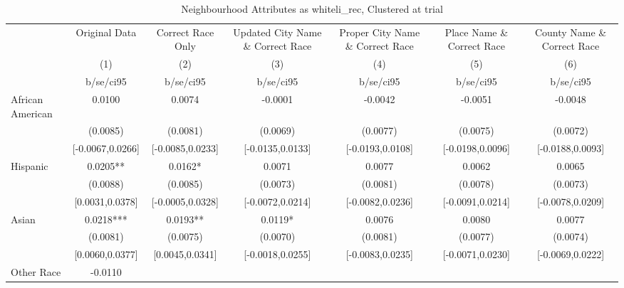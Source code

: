 \documentclass{article}
\begin{document}
\begin{table}[htbp]\centering
\def\sym#1{\ifmmode^{#1}\else\(^{#1}\)\fi}
\caption{Neighbourhood Attributes as whiteli\_rec, Clustered at trial}
\begin{tabular}{l*{6}{c}}
\toprule
                    &\multicolumn{1}{c}{Original Data}&\multicolumn{1}{c}{Correct Race Only}&\multicolumn{1}{c}{Updated City Name \& Correct Race}&\multicolumn{1}{c}{Proper City Name \& Correct Race}&\multicolumn{1}{c}{Place Name \& Correct Race}&\multicolumn{1}{c}{County Name \& Correct Race}\\\cmidrule(lr){2-2}\cmidrule(lr){3-3}\cmidrule(lr){4-4}\cmidrule(lr){5-5}\cmidrule(lr){6-6}\cmidrule(lr){7-7}
                    &\multicolumn{1}{c}{(1)}   &\multicolumn{1}{c}{(2)}   &\multicolumn{1}{c}{(3)}   &\multicolumn{1}{c}{(4)}   &\multicolumn{1}{c}{(5)}   &\multicolumn{1}{c}{(6)}   \\
                    &   b/se/ci95   &   b/se/ci95   &   b/se/ci95   &   b/se/ci95   &   b/se/ci95   &   b/se/ci95   \\
\midrule
African American    &      0.0100   &      0.0074   &     -0.0001   &     -0.0042   &     -0.0051   &     -0.0048   \\
                    &    (0.0085)   &    (0.0081)   &    (0.0069)   &    (0.0077)   &    (0.0075)   &    (0.0072)   \\
                    &[-0.0067,0.0266]   &[-0.0085,0.0233]   &[-0.0135,0.0133]   &[-0.0193,0.0108]   &[-0.0198,0.0096]   &[-0.0188,0.0093]   \\
Hispanic            &      0.0205** &      0.0162*  &      0.0071   &      0.0077   &      0.0062   &      0.0065   \\
                    &    (0.0088)   &    (0.0085)   &    (0.0073)   &    (0.0081)   &    (0.0078)   &    (0.0073)   \\
                    &[0.0031,0.0378]   &[-0.0005,0.0328]   &[-0.0072,0.0214]   &[-0.0082,0.0236]   &[-0.0091,0.0214]   &[-0.0078,0.0209]   \\
Asian               &      0.0218***&      0.0193** &      0.0119*  &      0.0076   &      0.0080   &      0.0077   \\
                    &    (0.0081)   &    (0.0075)   &    (0.0070)   &    (0.0081)   &    (0.0077)   &    (0.0074)   \\
                    &[0.0060,0.0377]   &[0.0045,0.0341]   &[-0.0018,0.0255]   &[-0.0083,0.0235]   &[-0.0071,0.0230]   &[-0.0069,0.0222]   \\
Other Race          &     -0.0110   &               &               &               &               &               \\

\end{tabular}
\end{table}
\end{document}
